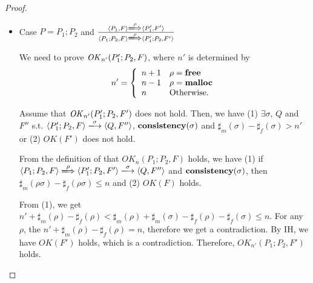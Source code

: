\begin{proof}
\begin{itemize}
\item Case \( P = P_1;P_2 \) and \( \frac{ \langle P_1, F \rangle
  \xLongrightarrow{\rho} \langle P_1', F' \rangle} { \langle P_1;P_2,
  F \rangle \xLongrightarrow{\rho} \langle P_1';P_2, F' \rangle } \)

  We need to prove \(\mathit{OK}_{n'}(P_1';P_2, F) \), where \(n'\) is
  determined by 
  \[
   n'=\left\{
   \begin{array}{ll}
     n + 1 & \rho = \mathbf{free}\\
     n - 1 & \rho = \mathbf{malloc}\\
     n & \mbox{Otherwise.}
   \end{array}
   \right.
   \]

  Assume that \(\mathit{OK}_{n'}(P_1';P_2, F') \) does not hold. Then, we have
  (1) \( \exists \sigma \), \(Q\) and \(F''\) s.t. \( \langle
  P_1';P_2, F \rangle \xlongrightarrow{\sigma} \langle Q, F'' \rangle
  \), \(\mathbf{consistency}(\sigma)\) and \(\sharp_{m}(\sigma) - \sharp_{f}(\sigma) > n'\)
  or (2) \( OK(F')\) does not hold.

  From the definition of that \(OK_n(P_1;P_2, F)\) holds, we have (1)
  if \( \langle P_1;P_2, F \rangle \xLongrightarrow{\rho} \langle
  P_1';P_2, F' \rangle \xlongrightarrow{\sigma} \langle Q, F'' \rangle
  \) and \(\mathbf{consistency}(\sigma)\), then \(\sharp_m(\rho\sigma) -
  \sharp_f(\rho\sigma) \le n \) and (2) \(OK(F)\) holds.

  From (1), we get \( n' + \sharp_m(\rho) - \sharp_f(\rho) <
  \sharp_m(\rho) + \sharp_m(\sigma) - \sharp_f(\rho) -
  \sharp_f(\sigma) \le n\). For any \(\rho\), the \( n' +
  \sharp_m(\rho) - \sharp_f(\rho) = n\), therefore we get a
  contradiction. By IH, we have \(OK(F')\) holds, which is a
  contradiction. Therefore, \(OK_{n'}(P_1;P_2, F')\) holds.

\end{itemize}
\end{proof}

